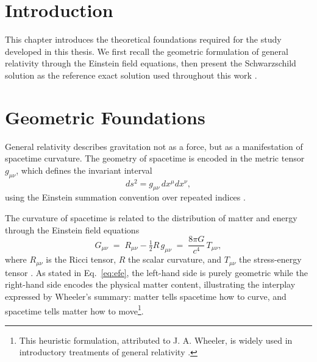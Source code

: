 \cleardoublepage
{}
{}
\ChapterHeader

\section{Introduction}
\label{ch:chap1}
This chapter introduces the theoretical foundations required for the study developed in this thesis. We first recall the geometric formulation of general relativity through the Einstein field equations, then present the Schwarzschild solution as the reference exact solution used throughout this work \cite{einstein1916,wald1984}.

\section{Geometric Foundations}

General relativity describes gravitation not as a force, but as a manifestation of spacetime curvature. The geometry of spacetime is encoded in the metric tensor $g_{\mu\nu}$, which defines the invariant interval
\begin{equation}
	ds^2 = g_{\mu\nu}\,dx^{\mu}dx^{\nu},
	\label{eq:metric}
\end{equation}
using the Einstein summation convention over repeated indices \cite{misner1973}.

The curvature of spacetime is related to the distribution of matter and energy through the Einstein field equations
\begin{equation}
	G_{\mu\nu} \;=\; R_{\mu\nu} - \tfrac{1}{2}R\,g_{\mu\nu} \;=\; \frac{8\pi G}{c^4}\,T_{\mu\nu},
	\label{eq:efe}
\end{equation}
where $R_{\mu\nu}$ is the Ricci tensor, $R$ the scalar curvature, and $T_{\mu\nu}$ the stress-energy tensor \cite{wald1984}. As stated in Eq.~\eqref{eq:efe}, the left-hand side is purely geometric while the right-hand side encodes the physical matter content, illustrating the interplay expressed by Wheeler's summary: matter tells spacetime how to curve, and spacetime tells matter how to move\footnote{This heuristic formulation, attributed to J. A. Wheeler, is widely used in introductory treatments of general relativity \cite{misner1973}.}.

